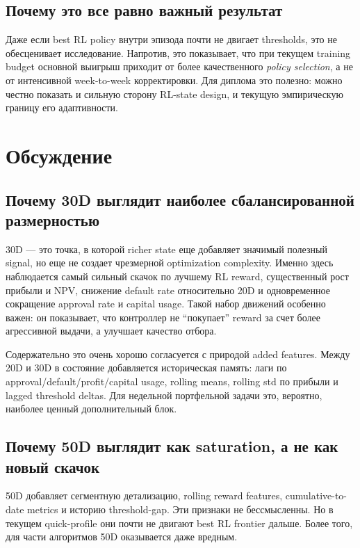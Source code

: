 \documentclass[12pt,a4paper]{article}
\begin{document}
\subsection{Почему это все равно важный результат}

Даже если best RL policy внутри эпизода почти не двигает thresholds, это не обесценивает исследование. Напротив, это показывает, что при текущем training budget основной выигрыш приходит от более качественного \emph{policy selection}, а не от интенсивной week-to-week корректировки. Для диплома это полезно: можно честно показать и сильную сторону RL-state design, и текущую эмпирическую границу его адаптивности.

\section{Обсуждение}

\subsection{Почему 30D выглядит наиболее сбалансированной размерностью}

30D --- это точка, в которой richer state еще добавляет значимый полезный signal, но еще не создает чрезмерной optimization complexity. Именно здесь наблюдается самый сильный скачок по лучшему RL reward, существенный рост прибыли и NPV, снижение default rate относительно 20D и одновременное сокращение approval rate и capital usage. Такой набор движений особенно важен: он показывает, что контроллер не ``покупает'' reward за счет более агрессивной выдачи, а улучшает качество отбора.

Содержательно это очень хорошо согласуется с природой added features. Между 20D и 30D в состояние добавляется историческая память: лаги по approval/default/profit/capital usage, rolling means, rolling std по прибыли и lagged threshold deltas. Для недельной портфельной задачи это, вероятно, наиболее ценный дополнительный блок.

\subsection{Почему 50D выглядит как saturation, а не как новый скачок}

50D добавляет сегментную детализацию, rolling reward features, cumulative-to-date metrics и историю threshold-gap. Эти признаки не бессмысленны. Но в текущем quick-profile они почти не двигают best RL frontier дальше. Более того, для части алгоритмов 50D оказывается даже вредным.
\end{document}

